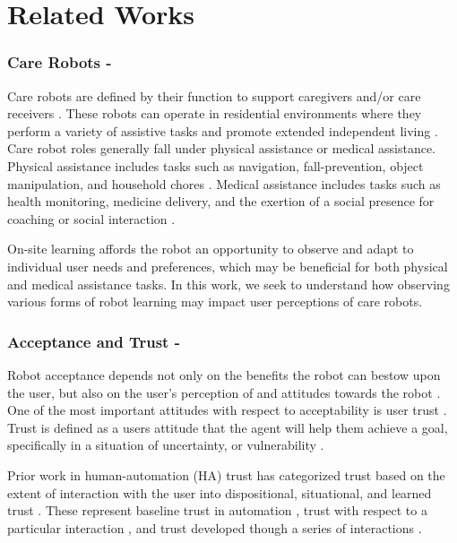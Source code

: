\documentclass[letterpaper]{article} %
\begin{document}
\section{Related Works}
\label{sec:relatedworks}

\subsubsection{Care Robots -}
Care robots are defined by their function to support caregivers and/or care receivers \cite{van_wynsberghe_designing_2013}. These robots can operate in residential environments where they perform a variety of assistive tasks and promote extended independent living \cite{johnson_socially_2014,sabanovic_robot_2015, fiorini_assistive_2021, lee_reframing_2018}. Care robot roles generally fall under physical assistance or medical assistance. Physical assistance includes tasks such as navigation, fall-prevention, object manipulation, and household chores \cite{moxi, fischinger_hobbit_2016, swisslog_healthcare_autonomous_nodate, kittmann_let_2015, kostavelis_ramcip_2016, miseikis_lio-personal_2020}. Medical assistance includes tasks such as health monitoring, medicine delivery, and the exertion of a social presence for coaching or social interaction \cite{vitanza_assistive_2019, coradeschi_giraffplus_2013, umbrico_holistic_2020, nao, pepper, martinez-martin_pharos_2019}.

On-site learning affords the robot an opportunity to observe and adapt to individual user needs and preferences, which may be beneficial for both physical and medical assistance tasks. In this work, we seek to understand how observing various forms of robot learning may impact user perceptions of care robots.

\subsubsection{Acceptance and Trust -}
Robot acceptance depends not only on the benefits the robot can bestow upon the user, but also on the user's perception of and attitudes towards the robot \cite{cesta_psychological_2007}. One of the most important attitudes with respect to acceptability is user trust \cite{yagoda_you_2012, langer_trust_2019}. Trust is defined as a users attitude that the agent will help them achieve a goal, specifically in a situation of uncertainty, or vulnerability \cite{kohn_measurement_2021, ullman_what_2018}.

Prior work in human-automation (HA) trust has categorized trust based on the extent of interaction with the user into dispositional, situational, and learned trust \cite{hoff_trust_2015}. These represent baseline trust in automation \cite{merritt_i_2013}, trust with respect to a particular interaction \cite{jian_foundations_2000}, and trust developed though a series of interactions \cite{de_visser_towards_2020}.
\end{document}

